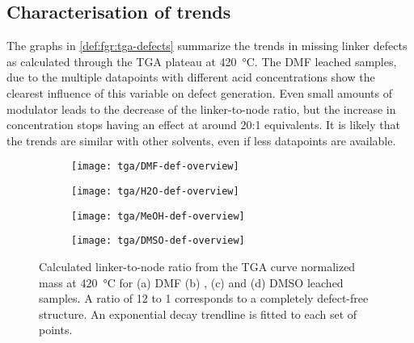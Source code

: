 
\subsection{Characterisation of trends}\label{def:trends}

The graphs in \autoref{def:fgr:tga-defects} summarize the 
trends in missing linker defects as calculated through 
the TGA plateau at \SI{420}{\degreeCelsius}. The DMF leached samples,
due to the multiple datapoints with different acid concentrations
show the clearest influence of this variable on defect
generation. Even small amounts of modulator leads to the decrease of 
the linker-to-node ratio, but the increase in concentration stops 
having an effect at around 20:1 equivalents. It is likely that
the trends are similar with other solvents, even if less 
datapoints are available.

\begin{figure}[htb]
    \centering

    \begin{subfigure}{0.25\linewidth}
        \texttt{[image: tga/DMF-def-overview]}%
        \caption{}%
        \label{def:fgr:tga-dmf-linkers}
    \end{subfigure}%
    \begin{subfigure}{0.25\linewidth}
        \texttt{[image: tga/H2O-def-overview]}%
        \caption{}%
        \label{def:fgr:tga-h2o-linkers}
    \end{subfigure}%
    \begin{subfigure}{0.25\linewidth}
        \texttt{[image: tga/MeOH-def-overview]}%
        \caption{}%
        \label{def:fgr:tga-meoh-linkers}
    \end{subfigure}%
    \begin{subfigure}{0.25\linewidth}
        \texttt{[image: tga/DMSO-def-overview]}%
        \caption{}%
        \label{def:fgr:tga-dmso-linkers}
    \end{subfigure}%

    \caption{Calculated linker-to-node ratio from the TGA curve 
    normalized mass at \SI{420}{\degreeCelsius} for (a) DMF 
    (b) , (c)  and (d) DMSO leached samples.
    A ratio of 12 to 1 corresponds to a completely defect-free
    structure. An exponential decay trendline is fitted to 
    each set of points.}%
    \label{def:fgr:tga-defects}
    
\end{figure}

